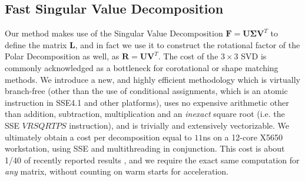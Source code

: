 \subsection{Fast Singular Value Decomposition}

Our method makes use of the Singular Value Decomposition $\mathbf{F}=\mathbf{U\Sigma V}^T$ to define the matrix $\mathbf{L}$, and in fact we use it to construct the rotational factor of
the Polar Decomposition as well, as $\mathbf{R}=\mathbf{UV}^T$. The cost of the $3\times 3$ SVD is commonly acknowledged as a bottleneck for corotational or shape matching methods. We
introduce a new, and highly efficient methodology which is virtually branch-free (other than the use of conditional assignments, which is an atomic instruction in SSE4.1 and other
platforms), uses no expensive arithmetic other than addition, subtraction, multiplication and an \emph{inexact} square root (i.e. the SSE $VRSQRTPS$ instruction), and is trivially
and extensively vectorizable. We ultimately obtain a cost per decomposition equal to $11$ns on a 12-core X5650 workstation, using SSE and multithreading in conjunction. This cost is
about 1/40 of recently reported results \cite{Rivers:2007:FFL}, and we require the exact same computation for \emph{any} matrix, without counting on warm starts for acceleration.

